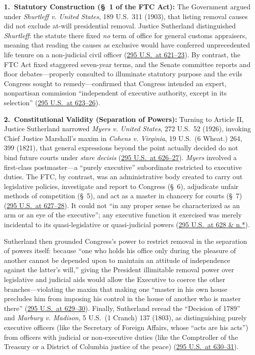 \documentclass[12pt]{article}
\begin{document}
\textbf{1.\ Statutory Construction (\S\ 1 of the FTC Act):} The Government argued under \textit{Shurtleff v. United States}, 189 U.S.\ 311 (1903), that listing removal causes did not exclude at-will presidential removal. Justice Sutherland distinguished \textit{Shurtleff}: the statute there fixed \textit{no} term of office for general customs appraisers, meaning that reading the causes as exclusive would have conferred unprecedented life tenure on a non-judicial civil officer (\href{https://supreme.justia.com/cases/federal/us/295/602/}{295 U.S.\ at 621--23}). By contrast, the FTC Act fixed staggered seven-year terms, and the Senate committee reports and floor debates---properly consulted to illuminate statutory purpose and the evils Congress sought to remedy---confirmed that Congress intended an expert, nonpartisan commission ``independent of executive authority, except in its selection'' (\href{https://supreme.justia.com/cases/federal/us/295/602/}{295 U.S.\ at 623--26}).

\textbf{2.\ Constitutional Validity (Separation of Powers):} Turning to Article II, Justice Sutherland narrowed \textit{Myers v. United States}, 272 U.S.\ 52 (1926), invoking Chief Justice Marshall's maxim in \textit{Cohens v. Virginia}, 19 U.S.\ (6 Wheat.) 264, 399 (1821), that general expressions beyond the point actually decided do not bind future courts under \textit{stare decisis} (\href{https://supreme.justia.com/cases/federal/us/295/602/}{295 U.S.\ at 626--27}). \textit{Myers} involved a first-class postmaster---a ``purely executive'' subordinate restricted to executive duties. The FTC, by contrast, was an administrative body created to carry out legislative policies, investigate and report to Congress (\S\ 6), adjudicate unfair methods of competition (\S\ 5), and act as a master in chancery for courts (\S\ 7) (\href{https://supreme.justia.com/cases/federal/us/295/602/}{295 U.S.\ at 627--28}). It could not ``in any proper sense be characterized as an arm or an eye of the executive''; any executive function it exercised was merely incidental to its quasi-legislative or quasi-judicial powers (\href{https://supreme.justia.com/cases/federal/us/295/602/}{295 U.S.\ at 628 \& n.*}).

Sutherland then grounded Congress's power to restrict removal in the separation of powers itself: because ``one who holds his office only during the pleasure of another cannot be depended upon to maintain an attitude of independence against the latter's will,'' giving the President illimitable removal power over legislative and judicial aids would allow the Executive to coerce the other branches---violating the maxim that making one ``master in his own house precludes him from imposing his control in the house of another who is master there'' (\href{https://supreme.justia.com/cases/federal/us/295/602/}{295 U.S.\ at 629--30}). Finally, Sutherland reread the ``Decision of 1789'' and \textit{Marbury v. Madison}, 5 U.S.\ (1 Cranch) 137 (1803), as distinguishing purely executive officers (like the Secretary of Foreign Affairs, whose ``acts are his acts'') from officers with judicial or non-executive duties (like the Comptroller of the Treasury or a District of Columbia justice of the peace) (\href{https://supreme.justia.com/cases/federal/us/295/602/}{295 U.S.\ at 630--31}).
\end{document}
